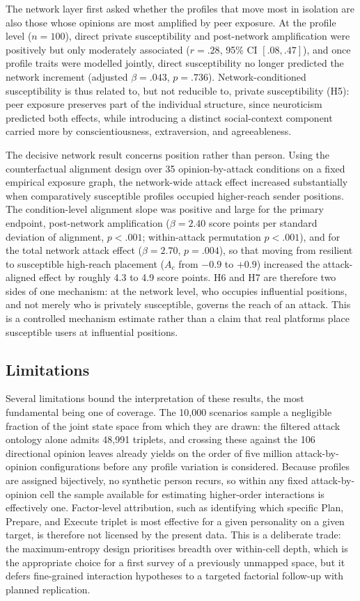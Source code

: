 \documentclass[11pt,a4paper]{article}
\begin{document}
The network layer first asked whether the profiles that move most in isolation are also those whose
opinions are most amplified by peer exposure. At the profile level ($n = 100$), direct private
susceptibility and post-network amplification were positively but only moderately associated
($r = .28$, 95\% CI $[.08, .47]$), and once profile traits were modelled jointly, direct
susceptibility no longer predicted the network increment (adjusted $\beta = .043$, $p = .736$).
Network-conditioned susceptibility is thus related to, but not reducible to, private susceptibility
(H5): peer exposure preserves part of the individual structure, since neuroticism predicted both
effects, while introducing a distinct social-context component carried more by conscientiousness,
extraversion, and agreeableness.

The decisive network result concerns position rather than person. Using the counterfactual alignment
design over 35 opinion-by-attack conditions on a fixed empirical exposure graph, the network-wide
attack effect increased substantially when comparatively susceptible profiles occupied higher-reach
sender positions. The condition-level alignment slope was positive and large for the primary endpoint,
post-network amplification ($\beta = 2.40$ score points per standard deviation of alignment,
$p < .001$; within-attack permutation $p < .001$), and for the total network attack effect
($\beta = 2.70$, $p = .004$), so that moving from resilient to susceptible high-reach placement
($A_c$ from $-0.9$ to $+0.9$) increased the attack-aligned effect by roughly 4.3 to 4.9 score
points. H6 and H7 are therefore two sides of one mechanism: at the network level, who occupies
influential positions, and not merely who is privately susceptible, governs the reach of an attack.
This is a controlled mechanism estimate rather than a claim that real platforms place susceptible
users at influential positions.

\subsection{Limitations}

Several limitations bound the interpretation of these results, the most fundamental being one
of coverage. The 10,000 scenarios sample a negligible fraction of the joint state space from
which they are drawn: the filtered attack ontology alone admits 48,991 triplets, and crossing
these against the 106 directional opinion leaves already yields on the order of five million
attack-by-opinion configurations before any profile variation is considered. Because profiles
are assigned bijectively, no synthetic person recurs, so within any fixed attack-by-opinion
cell the sample available for estimating higher-order interactions is effectively one.
Factor-level attribution, such as identifying which specific Plan, Prepare, and Execute triplet
is most effective for a given personality on a given target, is therefore not licensed by the
present data. This is a deliberate trade: the maximum-entropy design prioritises breadth over
within-cell depth, which is the appropriate choice for a first survey of a previously unmapped
space, but it defers fine-grained interaction hypotheses to a targeted factorial follow-up with
planned replication.
\end{document}
